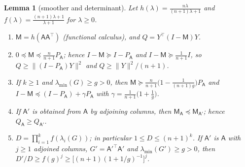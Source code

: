 \documentclass[11pt]{article}
\newtheorem{lemma}[theorem]{Lemma}
\theoremstyle{remark}
\newcommand{\tr}{^{\top}}
\begin{document}
\begin{lemma}[smoother and determinant]\label{lem:spec}
Let $h(\lambda)=\frac{n\lambda}{(n+1)\lambda+1}$ and $f(\lambda)=\frac{(n+1)\lambda+1}{\lambda+1}$ for $\lambda\ge0$.
\begin{enumerate}
\item[(a)] $\mathsf{M}=h(\mathsf{A}\mathsf{A}\tr)$ (functional calculus), and $Q=Y\tr(I-\mathsf{M})Y$.
\item[(b)] $0\preceq \mathsf{M}\preceq\frac n{n+1}P_{\mathsf{A}}$; hence $I-\mathsf{M}\succeq I-P_{\mathsf{A}}$ and $I-\mathsf{M}\succeq\frac1{n+1}I$, so $Q\ge\|(I-P_{\mathsf{A}})Y\|^2$ and $Q\ge\|Y\|^2/(n+1)$.
\item[(c)] If $k\ge1$ and $\lambda_{\min}(G)\ge g>0$, then $\mathsf{M}\succeq\frac n{n+1}\big(1-\frac1{(n+1)g}\big)P_{\mathsf{A}}$ and $I-\mathsf{M}\preceq(I-P_{\mathsf{A}})+\gamma P_{\mathsf{A}}$ with $\gamma=\frac1{n+1}\big(1+\frac1g\big)$.
\item[(d)] If $\mathsf{A}'$ is obtained from $\mathsf{A}$ by adjoining columns, then $\mathsf{M}_{\mathsf{A}}\preceq \mathsf{M}_{\mathsf{A}'}$; hence $Q_{\mathsf{A}}\ge Q_{\mathsf{A}'}$.
\item[(e)] $D=\prod_{i=1}^kf(\lambda_i(G))$; in particular $1\le D\le(n+1)^k$. If $\mathsf{A}'$ is $\mathsf{A}$ with $j\ge1$ adjoined columns, $G'=\mathsf{A}'^{\top}\mathsf{A}'$ and $\lambda_{\min}(G')\ge g>0$, then $D'/D\ge f(g)^j\ge\big[(n+1)(1+1/g)^{-1}\big]^j$.
\end{enumerate}
\end{lemma}
\end{document}
